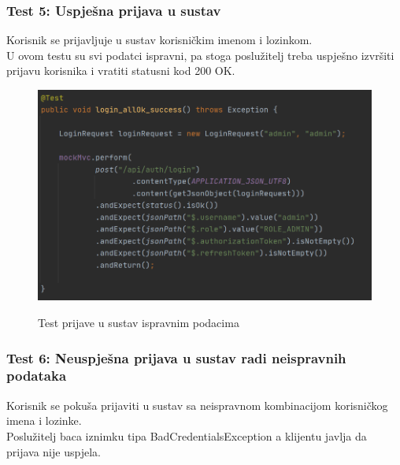 			\subsubsection{Test 5: Uspješna prijava u sustav}
			Korisnik se prijavljuje u sustav korisničkim imenom i lozinkom. \\
			U ovom testu su svi podatci ispravni, pa stoga poslužitelj treba uspješno izvršiti prijavu korisnika i vratiti statusni kod 200 OK.
			
			\begin{figure}[H]
				\centering
				\includegraphics[scale=0.75]{slike/test5} \\
				\caption{ Test prijave u sustav ispravnim podacima}
				\label{fig:test5}
			\end{figure}
		
			\subsubsection{Test 6: Neuspješna prijava u sustav radi neispravnih podataka}
			Korisnik se pokuša prijaviti u sustav sa neispravnom kombinacijom korisničkog imena i lozinke. \\
			Poslužitelj baca iznimku tipa BadCredentialsException a klijentu javlja da prijava nije uspjela.
			
